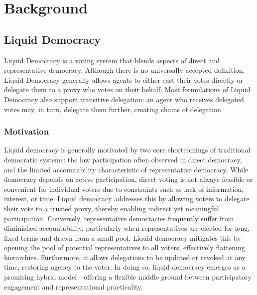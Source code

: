 \graphicspath{{../figures/}}

\chapter{Background}
\label{chap:background}

\section{Liquid Democracy}

Liquid Democracy is a voting system that blends aspects of direct and representative democracy. Although there is no universally accepted definition, Liquid Democracy generally allows agents to either cast their votes directly or delegate them to a proxy who votes on their behalf. Most formulations of Liquid Democracy also support transitive delegation: an agent who receives delegated votes may, in turn, delegate them further, creating chains of delegation. \cite{degraveResolvingMultiproxyTransitive2014, boldiViscousDemocracySocial2011, revel2022liquid, bersetcheGeneralizingLiquidDemocracy2022}

\subsection{Motivation}

Liquid democracy is generally motivated by two core shortcomings of traditional democratic systems: the low participation often observed in direct democracy, and the limited accountability characteristic of representative democracy. \cite{fordDelegativeDemocracy2002, brillInteractiveDemocracy2018} While democracy depends on active participation, direct voting is not always feasible or convenient for individual voters due to constraints such as lack of information, interest, or time. Liquid democracy addresses this by allowing voters to delegate their vote to a trusted proxy, thereby enabling indirect yet meaningful participation. Conversely, representative democracies frequently suffer from diminished accountability, particularly when representatives are elected for long, fixed terms and drawn from a small pool. Liquid democracy mitigates this by opening the pool of potential representatives to all voters, effectively flattening hierarchies. Furthermore, it allows delegations to be updated or revoked at any time, restoring agency to the voter. \cite{brillInteractiveDemocracy2018} In doing so, liquid democracy emerges as a promising hybrid model—offering a flexible middle ground between participatory engagement and representational practicality.

